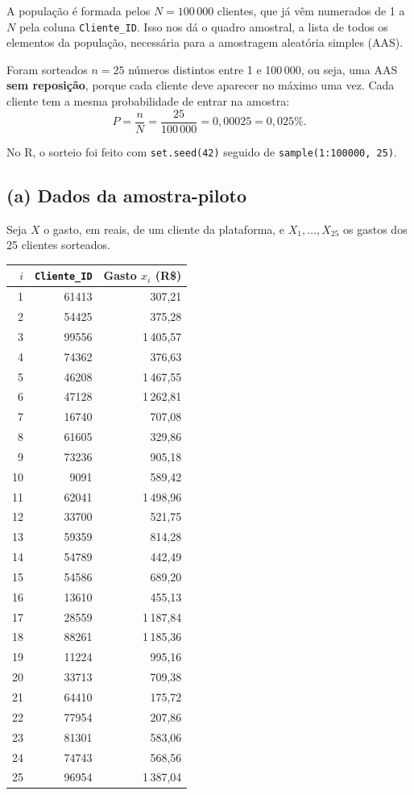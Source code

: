 \documentclass[12pt,a4paper]{article}
\begin{document}
A população é formada pelos $N = 100\,000$ clientes, que já vêm numerados de 1 a $N$ pela coluna \texttt{Cliente\_ID}. Isso nos dá o quadro amostral, a lista de todos os elementos da população, necessária para a amostragem aleatória simples (AAS).

Foram sorteados $n = 25$ números distintos entre 1 e 100\,000, ou seja, uma AAS \textbf{sem reposição}, porque cada cliente deve aparecer no máximo uma vez. Cada cliente tem a mesma probabilidade de entrar na amostra:
$$P = \frac{n}{N} = \frac{25}{100\,000} = 0{,}00025 = 0{,}025\%.$$

No R, o sorteio foi feito com \texttt{set.seed(42)} seguido de \texttt{sample(1:100000, 25)}.

\subsection*{(a) Dados da amostra-piloto}

Seja $X$ o gasto, em reais, de um cliente da plataforma, e $X_1, \dots, X_{25}$ os gastos dos 25 clientes sorteados.

\begin{center}
\begin{tabular}{rrr}
\toprule
$i$ & \texttt{Cliente\_ID} & Gasto $x_i$ (R\$) \\
\midrule
1 & 61413 & 307,21 \\
2 & 54425 & 375,28 \\
3 & 99556 & 1\,405,57 \\
4 & 74362 & 376,63 \\
5 & 46208 & 1\,467,55 \\
6 & 47128 & 1\,262,81 \\
7 & 16740 & 707,08 \\
8 & 61605 & 329,86 \\
9 & 73236 & 905,18 \\
10 & 9091 & 589,42 \\
11 & 62041 & 1\,498,96 \\
12 & 33700 & 521,75 \\
13 & 59359 & 814,28 \\
14 & 54789 & 442,49 \\
15 & 54586 & 689,20 \\
16 & 13610 & 455,13 \\
17 & 28559 & 1\,187,84 \\
18 & 88261 & 1\,185,36 \\
19 & 11224 & 995,16 \\
20 & 33713 & 709,38 \\
21 & 64410 & 175,72 \\
22 & 77954 & 207,86 \\
23 & 81301 & 583,06 \\
24 & 74743 & 568,56 \\
25 & 96954 & 1\,387,04 \\
\bottomrule
\end{tabular}
\end{center}
\end{document}
